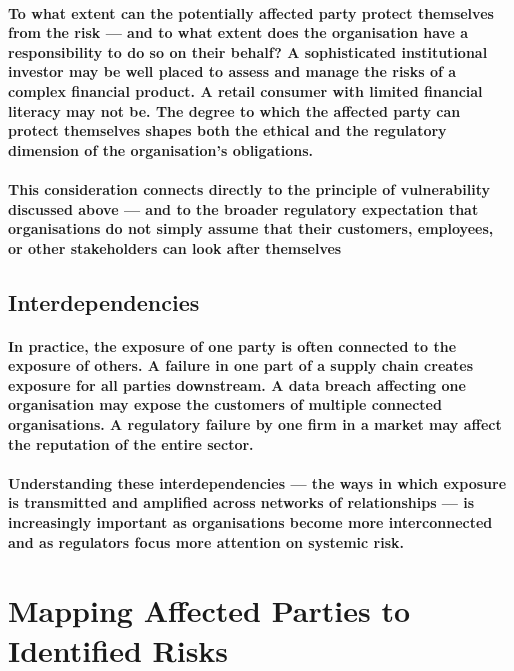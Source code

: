 \paragraph{To what extent can the potentially affected party protect themselves from the risk — and to what extent does the organisation have a responsibility to do so on their behalf? A sophisticated institutional investor may be well placed to assess and manage the risks of a complex financial product. A retail consumer with limited financial literacy may not be. The degree to which the affected party can protect themselves shapes both the ethical and the regulatory dimension of the organisation's obligations.}
\paragraph{This consideration connects directly to the principle of vulnerability discussed above — and to the broader regulatory expectation that organisations do not simply assume that their customers, employees, or other stakeholders can look after themselves}

\subsection{Interdependencies}
\paragraph{In practice, the exposure of one party is often connected to the exposure of others. A failure in one part of a supply chain creates exposure for all parties downstream. A data breach affecting one organisation may expose the customers of multiple connected organisations. A regulatory failure by one firm in a market may affect the reputation of the entire sector.}
\paragraph{Understanding these interdependencies — the ways in which exposure is transmitted and amplified across networks of relationships — is increasingly important as organisations become more interconnected and as regulators focus more attention on systemic risk.}

\section{Mapping Affected Parties to Identified Risks}
